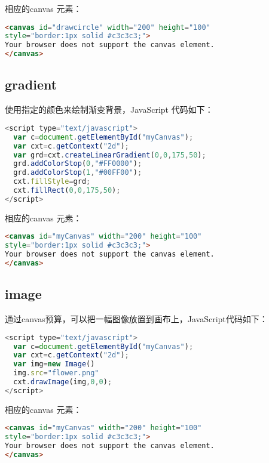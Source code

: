 相应的canvas 元素：

\begin{lstlisting}[language=HTML]
<canvas id="drawcircle" width="200" height="100" 
style="border:1px solid #c3c3c3;">
Your browser does not support the canvas element.
</canvas>
\end{lstlisting}

\subsection{gradient}


使用指定的颜色来绘制渐变背景，JavaScript 代码如下：

\begin{lstlisting}[language=JavaScript]
<script type="text/javascript">
  var c=document.getElementById("myCanvas");
  var cxt=c.getContext("2d");
  var grd=cxt.createLinearGradient(0,0,175,50);
  grd.addColorStop(0,"#FF0000");
  grd.addColorStop(1,"#00FF00");
  cxt.fillStyle=grd;
  cxt.fillRect(0,0,175,50);
</script>
\end{lstlisting}

相应的canvas 元素：


\begin{lstlisting}[language=HTML]
<canvas id="myCanvas" width="200" height="100" 
style="border:1px solid #c3c3c3;">
Your browser does not support the canvas element.
</canvas>
\end{lstlisting}


\subsection{image}

通过canvas预算，可以把一幅图像放置到画布上，JavaScript代码如下：


\begin{lstlisting}[language=JavaScript]
<script type="text/javascript">
  var c=document.getElementById("myCanvas");
  var cxt=c.getContext("2d");
  var img=new Image()
  img.src="flower.png"
  cxt.drawImage(img,0,0);
</script>
\end{lstlisting}

相应的canvas 元素：

\begin{lstlisting}[language=HTML]
<canvas id="myCanvas" width="200" height="100" 
style="border:1px solid #c3c3c3;">
Your browser does not support the canvas element.
</canvas>
\end{lstlisting}


